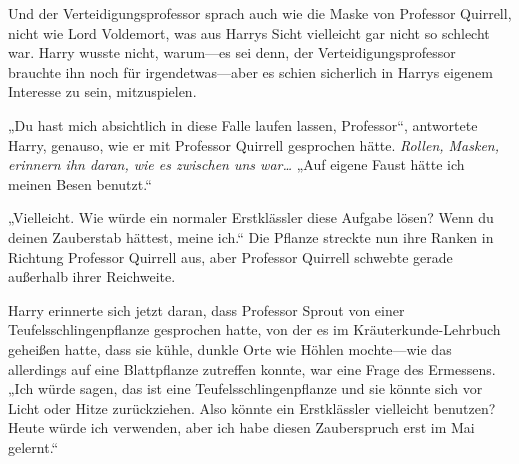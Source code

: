 Und der Verteidigungsprofessor sprach auch wie die Maske von Professor Quirrell, nicht wie Lord Voldemort, was aus Harrys Sicht vielleicht gar nicht so schlecht war. Harry wusste nicht, warum—es sei denn, der Verteidigungsprofessor brauchte ihn noch für irgendetwas—aber es schien sicherlich in Harrys eigenem Interesse zu sein, mitzuspielen.

„Du hast mich absichtlich in diese Falle laufen lassen, Professor“, antwortete Harry, genauso, wie er mit Professor Quirrell gesprochen hätte.
\emph{Rollen, Masken, erinnern ihn daran, wie es zwischen uns war…}
„Auf eigene Faust hätte ich meinen Besen benutzt.“

„Vielleicht. Wie würde ein normaler Erstklässler diese Aufgabe lösen? Wenn du deinen Zauberstab hättest, meine ich.“
Die Pflanze streckte nun ihre Ranken in Richtung Professor Quirrell aus, aber Professor Quirrell schwebte gerade außerhalb ihrer Reichweite.

Harry erinnerte sich jetzt daran, dass Professor Sprout von einer Teufelsschlingenpflanze gesprochen hatte, von der es im Kräuterkunde-Lehrbuch geheißen hatte, dass sie kühle, dunkle Orte wie Höhlen mochte—wie das allerdings auf eine Blattpflanze zutreffen konnte, war eine Frage des Ermessens.
„Ich würde sagen, das ist eine Teufelsschlingenpflanze und sie könnte sich vor Licht oder Hitze zurückziehen. Also könnte ein Erstklässler vielleicht  benutzen? Heute würde ich  verwenden, aber ich habe diesen Zauberspruch erst im Mai gelernt.“

